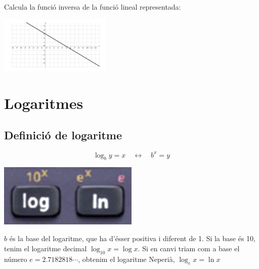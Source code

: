 \begin{mylist}
\exer  Calcula la funció inversa de la funció lineal representada:

\begin{center}
	  \includegraphics*[width=2.1in]{img-05/ex24-fe.pdf}
\end{center}


\end{mylist}

\pagebreak
\section{Logaritmes}

\subsection{Definició de logaritme}
\begin{theorybox}
	
	\begin{minipage}{0.7\textwidth}
		\begin{equation*}
			\log_b y = x  \quad \leftrightarrow \quad b^x = y
		\end{equation*}
	\end{minipage}
	\begin{minipage}{0.3\textwidth}
		\includegraphics[width=0.5\textwidth]{img-05/log-calculadora}
	\end{minipage}
	
	$b$ és la base del logaritme, que ha d'ésser positiva i diferent de 1. Si la base és 10, tenim el logaritme decimal $\log_{10} x= \log x$. Si en canvi triam com a base el número $e=2.7182818\cdots$, obtenim el logaritme Neperià, $\log_e x= \ln x$
\end{theorybox}

